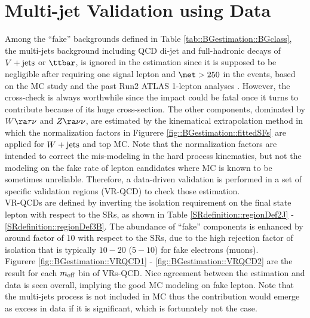 \clearpage
\section{Multi-jet Validation using Data} \label{sec::BGestimation::VRQCD}
Among the ``fake'' backgrounds defined in Table \ref{tab::BGestimation::BGclass}, 
the multi-jets background including QCD di-jet and full-hadronic decays of $V+\mathrm{jets}$ or $\ttbar$, is ignored in the estimation since it is supposed to be negligible after requiring one signal lepton and $\met>250$ in the events, based on the MC study and the past Run2 ATLAS 1-lepton analyses \cite{strong1L_3p2fb_paper}\cite{strong1L_ICHEP2016_CONF}.
However, the cross-check is always worthwhile since the impact could be fatal once it turns to contribute because of its huge cross-section. 
The other components, dominated by $W\ra\tau\nu$ and $Z\ra\nu\nu$, are estimated by the kinematical extrapolation method in which the normalization factors in Figurere \ref{fig::BGestimation::fittedSFs} are applied for $W+\mathrm{jets}$ and top MC. Note that the normalization factors are intended to correct the mis-modeling in the hard process kinematics, but not the modeling on the fake rate of lepton candidates where MC is known to be sometimes unreliable. 
Therefore, a data-driven validation is performed in a set of specific validation regions (VR-QCD) to check those estimation. \\

VR-QCDs are defined by inverting the isolation requirement on the final state lepton with respect to the SRs, as shown in Table \ref{SRdefinition::regionDef2J} - \ref{SRdefinition::regionDef3B}. 
The abundance of ``fake'' components is enhanced by around factor of 10 with respect to the SRs, due to the high rejection factor of isolation that is typically $10-20$ ($5-10$) for fake electrons (muons). \\

Figurere \ref{fig::BGestimation::VRQCD1} - \ref{fig::BGestimation::VRQCD2} are the result for each $m_{\mathrm{eff}}$ bin of VRs-QCD. Nice agreement between the estimation and data is seen overall, implying the good MC modeling on fake lepton. Note that the multi-jets process is not included in MC thus the contribution would emerge as excess in data if it is significant, which is fortunately not the case. \\

